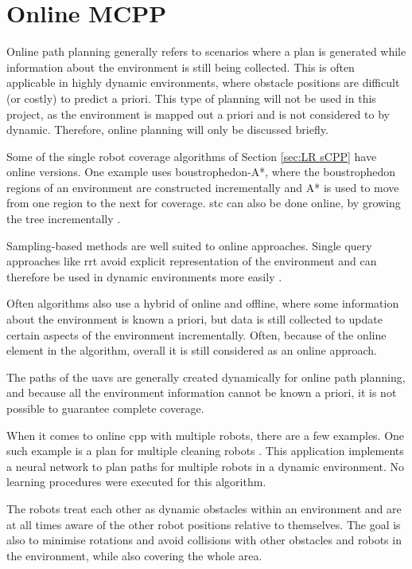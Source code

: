 \section{Online MCPP}
\label{sec:LR Online MCPP}
Online path planning generally refers to scenarios where a plan is generated while information about the environment is still being collected. This is often applicable in highly dynamic environments, where obstacle positions are difficult (or costly) to predict a priori. This type of planning will not be used in this project, as the environment is mapped out a priori and is not considered to by dynamic. Therefore, online planning will only be discussed briefly.

Some of the single robot coverage algorithms of Section \ref{sec:LR sCPP} have online versions. One example uses boustrophedon-A*, where the boustrophedon regions of an environment are constructed incrementally and A* is used to move from one region to the next for coverage\cite{Viet2012}. \ac{stc} can also be done online, by growing the tree incrementally \cite{Gabriely2001}. 

Sampling-based methods are well suited to online approaches. Single query approaches like \ac{rrt} avoid explicit representation of the environment and can therefore be used in dynamic environments more easily \cite{Lavalle2006}.

Often algorithms also use a hybrid of online and offline, where some information about the environment is known a priori, but data is still collected to update certain aspects of the environment incrementally. Often, because of the online element in the algorithm, overall it is still considered as an online approach. 

The paths of the \acp{uav} are generally created dynamically for online path planning, and because all the environment information cannot be known a priori, it is not possible to guarantee complete coverage.

When it comes to online \ac{cpp} with multiple robots, there are a few examples. One such example is a plan for multiple cleaning robots \cite{Luo2002}. This application implements a neural network to plan paths for multiple robots in a dynamic environment. No learning procedures were executed for this algorithm. 

The robots treat each other as dynamic obstacles within an environment and are at all times aware of the other robot positions relative to themselves. The goal is also to minimise rotations and avoid collisions with other obstacles and robots in the environment, while also covering the whole area. 

